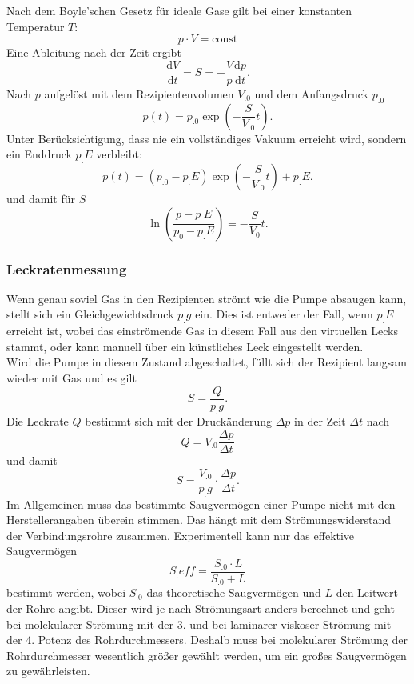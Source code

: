 Nach dem Boyle'schen Gesetz für ideale Gase gilt bei einer konstanten Temperatur $T$:
\begin{equation}
p\cdot V =\text{const}\label{eq:Boyle}
\end{equation}
Eine Ableitung nach der Zeit ergibt
\[
\frac{\mathrm{d}V}{\mathrm{d}t} = S = - \frac{V}{p} \frac{\mathrm{d}p}{\mathrm{d}t}\text{.}
\]
Nach $p$ aufgelöst mit dem Rezipientenvolumen $V_.0$ und dem Anfangsdruck $p_.0$
\begin{equation}
p(t)=p_.0\exp{\left(-\frac{S}{V_.0}t\right)}\label{eq:pt1}\text{.}
\end{equation}
Unter Berücksichtigung, dass nie ein vollständiges Vakuum erreicht wird, sondern ein Enddruck $p_.E$ verbleibt:
\begin{equation}
p(t)=(p_.0-p_.E)\exp{\left(-\frac{S}{V_.0}t\right)}+p_.E\text{.}\label{eq:pt2}
\end{equation}
und damit für $S$
\begin{equation}
\ln\left(\frac{p-p_.E}{p_0-p_.E}\right) = -\frac{S}{V_0}t\text{.}\label{eq:S2}
\end{equation}

\subsubsection{Leckratenmessung}

Wenn genau soviel Gas in den Rezipienten strömt wie die Pumpe absaugen kann, stellt sich ein Gleichgewichtsdruck $p_.g$ ein. Dies ist entweder der Fall, wenn $p_.E$ erreicht ist, wobei das einströmende Gas in diesem Fall aus den virtuellen Lecks stammt, oder kann manuell über ein künstliches Leck eingestellt werden. \\
Wird die Pumpe in diesem Zustand abgeschaltet, füllt sich der Rezipient langsam wieder mit Gas und es gilt 
\[
S=\frac{Q}{p_.g}\text{.}
\]
Die Leckrate $Q$ bestimmt sich mit der Druckänderung $\Delta p$ in der Zeit $\Delta t$ nach
\[
Q=V_.0\frac{\Delta p}{\Delta t}
\]
und damit
\begin{equation}
S=\frac{V_.0}{p_.g}\cdot\frac{\Delta p}{\Delta t}\text{.}\label{eq:S}
\end{equation}
\newline\newline
Im Allgemeinen muss das bestimmte Saugvermögen einer Pumpe nicht mit den Herstellerangaben überein stimmen.
Das hängt mit dem Strömungswiderstand der Verbindungsrohre zusammen.
Experimentell kann nur das effektive Saugvermögen
\begin{equation}
S_.{eff}=\frac{S_.0\cdot L}{S_.0+L}
\end{equation}
bestimmt werden, wobei $S_.0$ das theoretische Saugvermögen und $L$ den Leitwert der Rohre angibt.
Dieser wird je nach Strömungsart anders berechnet und geht bei molekularer Strömung mit der 3. und bei laminarer viskoser Strömung mit der 4. Potenz des Rohrdurchmessers\cite{V70}.
Deshalb muss bei molekularer Strömung der Rohrdurchmesser wesentlich größer gewählt werden, um ein großes Saugvermögen zu gewährleisten.

